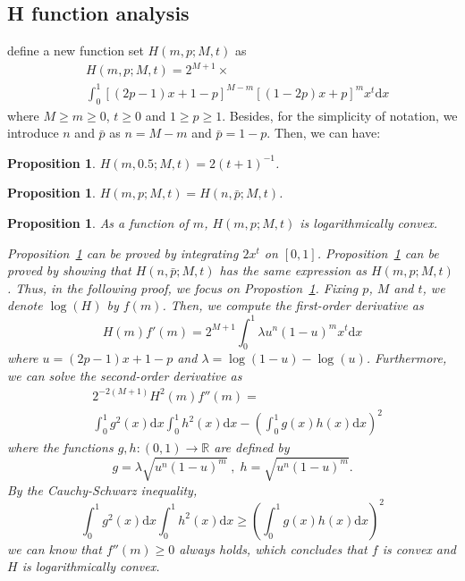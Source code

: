 \documentclass{article}
\makeatletter
\newtheorem{proposition}[theorem]{Proposition}
\renewenvironment{proof}[1][\proofname]{\par
  \vspace{-\topsep}%
  \pushQED{\qed}%
  \normalfont
  \topsep0pt \partopsep0pt %
  \trivlist
  \item[\hskip\labelsep
        \itshape
    #1\@addpunct{.}]\ignorespaces
}{%
  \popQED\endtrivlist\@endpefalse
  \addvspace{0pt plus 0pt} %
}
\makeatother
\begin{document}
\subsection{H function analysis}
\label{HFunSec}
define a new function set $H(m,p;M,t)$ as
\begin{align}
&H(m,p;M,t)=2^{M+1}\times \label{Hfunction}\\
&\int_{0}^{1}[(2p-1)x+1-p]^{M-m}[(1-2p)x+p]^{m}x^t\mathrm{d}x \nonumber
\end{align}
where $M\geq m\geq 0$, $t\geq 0$ and $1\geq p\geq 1$.
Besides, for the simplicity of notation, we introduce $n$ and $\bar{p}$ as $n=M-m$ and $\bar{p}=1-p$.
Then, we can have:
\begin{proposition}
\label{MidPoint}
$H(m,0.5;M,t) = 2(t+1)^{-1}$.
\end{proposition}
\begin{proposition}
\label{Symmetry}
$H(m,p;M,t) = H(n, \bar{p};M,t)$.
\end{proposition}
\begin{proposition}
\label{LogConvexity}
As a function of $m$, $H(m,p;M,t)$ is logarithmically convex.
\begin{proof}
Proposition~\ref{MidPoint} can be proved by integrating $2 x^t$ on $[0,1]$.
Proposition~\ref{Symmetry} can be proved by showing that $H(n, \bar{p};M,t)$ has the same expression as $H(m,p;M,t)$.
Thus, in the following proof, we focus on Propostion~\ref{LogConvexity}. Fixing $p$, $M$ and $t$, we denote $\log (H)$ by $f(m)$. Then, we compute the first-order derivative as
\begin{equation}
H(m)f'(m)=2^{M+1}\int_{0}^{1}\lambda u^{n}(1-u)^{m}x^t\mathrm{d}x
\end{equation}
where $u= (2p-1)x+1-p$ and $\lambda=\log(1-u)-\log(u)$. Furthermore, we can solve the second-order derivative as
\begin{equation}
\begin{split}
&2^{-2(M+1)}H^2(m)f''(m)=\\
&\int_{0}^{1}g^2(x)\mathrm{d}x\int_{0}^{1}h^2(x)\mathrm{d}x-\left(\int_{0}^{1}g(x)h(x)\mathrm{d}x\right)^2
\end{split}
\end{equation}
where the functions $g,h:(0,1)\rightarrow  \mathbb{R}$ are defined by
\begin{equation}
g=\lambda\sqrt{u^{n}(1-u)^{m}}\;, \; h = \sqrt{u^{n}(1-u)^{m}}.
\end{equation}
By the Cauchy-Schwarz inequality,
\begin{equation}
\int_{0}^{1}g^2(x)\mathrm{d}x\int_{0}^{1}h^2(x)\mathrm{d}x\geq \left(\int_{0}^{1}g(x)h(x)\mathrm{d}x\right)^2
\end{equation}
we can know that $f''(m)\geq 0$ always holds, which concludes that $f$ is convex and $H$ is logarithmically convex.
\end{proof}
\end{proposition}
\end{document}
